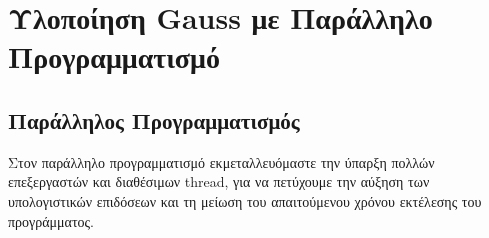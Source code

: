 \chapter{Υλοποίηση {\lt Gauss} με Παράλληλο Προγραμματισμό}


\section{Παράλληλος Προγραμματισμός}

Στον παράλληλο προγραμματισμό εκμεταλλευόμαστε την ύπαρξη πολλών επεξεργαστών και διαθέσιμων {\lt thread}, για να πετύχουμε την αύξηση των υπολογιστικών επιδόσεων και τη μείωση του απαιτούμενου χρόνου εκτέλεσης του προγράμματος. 
\\




\newpage


